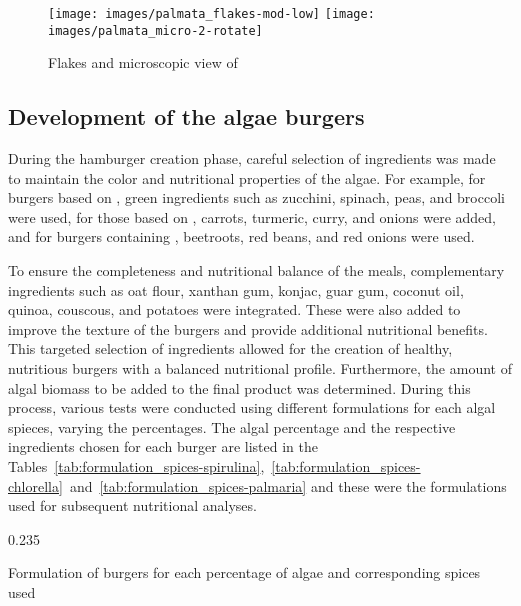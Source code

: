 \begin{figure}[H]
\centering
	\subcaptionbox*{\label{subfig:palmaria_flakes}}%
		{\texttt{[image: images/palmata\_flakes-mod-low]}}%
\hfill
	\subcaptionbox*{\label{subfig:palmaria_micro}}%
		{\texttt{[image: images/palmata\_micro-2-rotate]}}%
\caption{Flakes and microscopic view of }%
\label{fig:palmaria_views}
\end{figure}


\subsection{Development of the algae burgers}
During the hamburger creation phase, careful selection of ingredients was made to maintain the color and nutritional properties of the algae. For example, for burgers based on , green ingredients such as zucchini, spinach, peas, and broccoli were used, for those based on , carrots, turmeric, curry, and onions were added, and for burgers containing , beetroots, red beans, and red onions were used.

To ensure the completeness and nutritional balance of the meals, complementary ingredients such as oat flour, xanthan gum, konjac, guar gum, coconut oil, quinoa, couscous, and potatoes were integrated. These were also added to improve the texture of the burgers and provide additional nutritional benefits. This targeted selection of ingredients allowed for the creation of healthy, nutritious burgers with a balanced nutritional profile. Furthermore, the amount of algal biomass to be added to the final product was determined. During this process, various tests were conducted using different formulations for each algal spieces, varying the percentages. The algal percentage and the respective ingredients chosen for each burger are listed in the Tables~\ref{tab:formulation_spices-spirulina},~\ref{tab:formulation_spices-chlorella}~and~\ref{tab:formulation_spices-palmaria} and these were the formulations used for subsequent nutritional analyses.

\begin{table}[H]
\footnotesize
\centering
	\begin{subcaptionblock}{0.68\textwidth}
	\centering
	\end{subcaptionblock}%
\hspace*{\hbtwsfig}%
	\begin{subcaptionblock}[][19.1em][c]{0.235\textwidth}
	\centering
	\end{subcaptionblock}%
\caption{Formulation of  burgers for each percentage of algae and corresponding spices used}
\label{tab:formulation_spices-spirulina}
\end{table}

